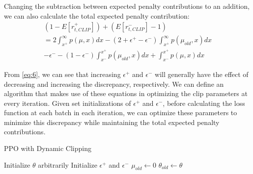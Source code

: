 \documentclass[letterpaper,twocolumn,10pt]{article}
\begin{document}
Changing the subtraction between expected penalty contributions to an addition,
we can also calculate the total expected penalty contribution:
\begin{equation}
    \begin{aligned}
        (1 - E[r_{t, CLIP}^{+}]) + (E[r_{t, CLIP}^{-}] - 1)\\
        =
        2\int_{x^{+}}^{\infty}
        p(\mu, x)
        dx -
        (2 + \epsilon^+ - \epsilon^-)
        \int_{x^{+}}^{\infty}p(\mu_{old}, x)dx\\
        -
        \epsilon^-
        - 
        (1 - \epsilon^-)
        \int_{x^{-}}^{x^{+}}p(\mu_{old}, x)dx + 
        \int_{x^{-}}^{x^{+}}p(\mu, x)dx
    \end{aligned}
    \label{eq:7}
\end{equation}

From \eqref{eq:6}, we can see that increasing $\epsilon^+$ and $\epsilon^-$ will
generally have the effect of decreasing and increasing the discrepancy,
respectively. We can define an algorithm that makes use of these equations
in optimizing the clip parameters at every iteration. Given set initializations
of $\epsilon^+$ and $\epsilon^-$, before calculating the loss function at each
batch in each iteration, we can optimize these parameters to minimize
this discrepancy while maintaining the total expected penalty contributions.

\begin{algorithm}[H]
    \caption{PPO with Dynamic Clipping}
    \begin{algorithmic}
        \State Initialize $\theta$ arbitrarily
        \State Initialize $\epsilon^+$ and $\epsilon^-$
        \State $\mu_{old} \gets 0$
            \State $\theta_{old} \gets \theta$

                \EndIf
            \EndFor
        \EndWhile
    \end{algorithmic}
\end{algorithm}
\end{document}
